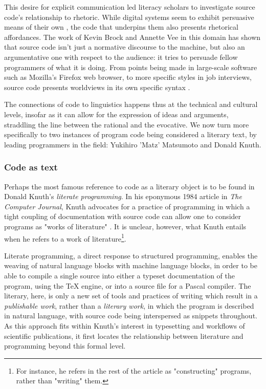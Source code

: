 This desire for explicit communication led literacy scholars to investigate source code's relationship to rhetoric. While digital systems seem to exhibit persuasive means of their own \citep{bogost_rhetoric_2008} \citep{frasca_simulation_2013}, the code that underpins them also presents rhetorical affordances. The work of Kevin Brock and Annette Vee in this domain has shown that source code isn't just a normative discourse to the machine, but also an argumentative one with respect to the audience: it tries to persuade fellow programmers of what it is doing. From points being made in large-scale software such as Mozilla's Firefox web browser, to more specific styles in job interviews, source code presents worldviews in its own specific syntax \citep{brock_rhetorical_2019}.

The connections of code to linguistics happens thus at the technical and cultural levels, insofar as it can allow for the expression of ideas and arguments, straddling the line between the rational and the evocative. We now turn more specifically to two instances of program code being considered a literary text, by leading programmers in the field: Yukihiro 'Matz' Matsumoto and Donald Knuth.

\subsubsection{Code as text}
\label{subsubsec:code-text}

Perhaps the most famous reference to code as a literary object is to be found in Donald Knuth's \emph{literate programming}. In his eponymous 1984 article in \emph{The Computer Journal}, Knuth advocates for a practice of programming in which a tight coupling of documentation with source code can allow one to consider programs as "works of literature" \citep{knuth_literate_1984}. It is unclear, however, what Knuth entails when he refers to a work of literature\footnote{For instance, he refers in the rest of the article as "constructing" programs, rather than "writing" them.}.

Literate programming, a direct response to structured programming, enables the weaving of natural language blocks with machine language blocks, in order to be able to compile a single source into either a typeset documentation of the program, using the TeX engine, or into a source file for a Pascal compiler. The literary, here, is only a new set of tools and practices of writing which result in a \emph{publishable work}, rather than a \emph{literary work}, in which the program is described in natural language, with source code being interspersed as snippets throughout. As this approach fits within Knuth's interest in typesetting and workflows of scientific publications, it first locates the relationship between literature and programming beyond this formal level.

